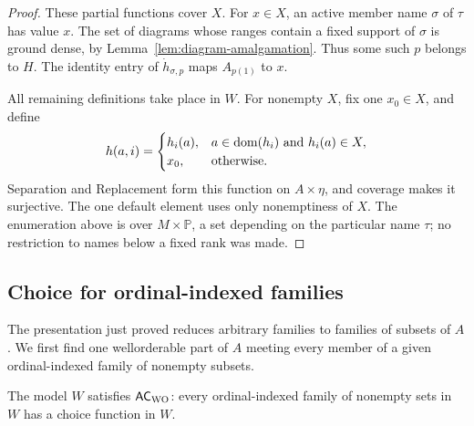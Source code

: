 \begin{proof}
These partial functions cover \(X\).
For \(x\in X\), an active member name \(\sigma\) of \(\tau\)
has value \(x\).
The set of diagrams whose ranges contain a fixed support of
\(\sigma\) is ground dense, by
Lemma~\ref{lem:diagram-amalgamation}.
Thus some such \(p\) belongs to \(H\).
The identity entry of \(\dot h_{\sigma,p}\) maps \(A_{p(1)}\)
to \(x\).

All remaining definitions take place in \(W\).
For nonempty \(X\), fix one \(x_0\in X\), and define
\[
 h(a,i)=
 \begin{cases}
 h_i(a),&a\in\operatorname{dom}(h_i)\text{ and }h_i(a)\in X,\\
 x_0,&\text{otherwise}.
 \end{cases}
\]
Separation and Replacement form this function on \(A\times\eta\),
and coverage makes it surjective.
The one default element uses only nonemptiness of \(X\).
The enumeration above is over \(M\times\mathbb P\), a set
depending on the particular name \(\tau\); no restriction to
names below a fixed rank was made.
\end{proof}

\subsection{Choice for ordinal-indexed families}

The presentation just proved reduces arbitrary families to families of
subsets of $A$. We first find one wellorderable part of $A$ meeting every
member of a given ordinal-indexed family of nonempty subsets.

\begin{proposition}\label{prop:ordinal-choice}
The model \(W\) satisfies \(\mathsf{AC}_{\mathrm{WO}}\): every ordinal-indexed
family of nonempty sets in \(W\) has a choice function in \(W\).
\end{proposition}

